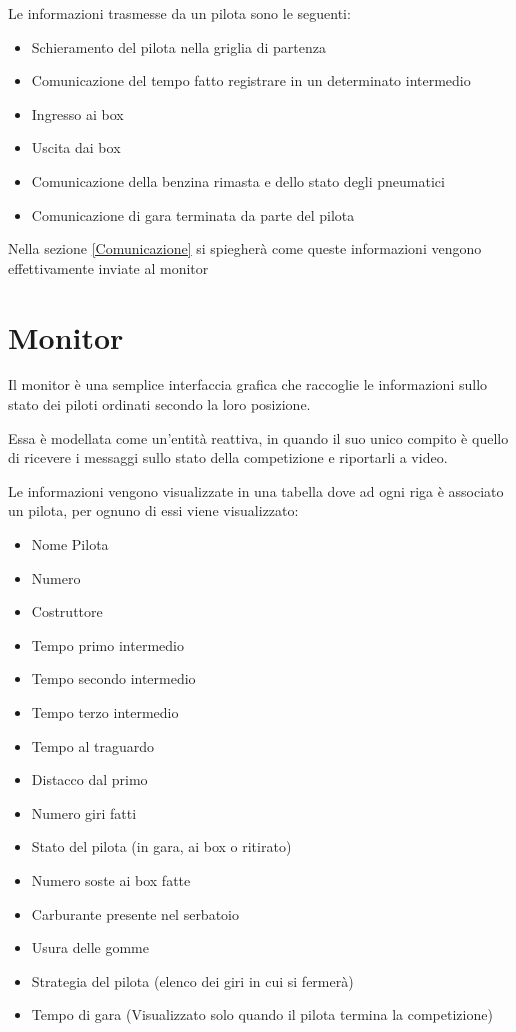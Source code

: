 \documentclass[a4paper,11pt, twoside]{book}
\begin{document}
	Le informazioni trasmesse da un pilota sono le seguenti:
	
	\begin{itemize}
	  \item Schieramento del pilota nella griglia di partenza
	  \item Comunicazione del tempo fatto registrare in un determinato intermedio
	  \item Ingresso ai box
	  \item Uscita dai box
	  \item Comunicazione della benzina rimasta e dello stato degli pneumatici
	  \item Comunicazione di gara terminata da parte del pilota
	\end{itemize}
	
	Nella sezione \ref{Comunicazione} si spiegherà come queste informazioni vengono effettivamente inviate al monitor
	
    \section{Monitor}
      Il monitor è una semplice interfaccia grafica che raccoglie le informazioni sullo stato dei piloti ordinati secondo
      la loro posizione.
      
      Essa è modellata come un'entità reattiva, in quando il suo unico compito è quello di ricevere i messaggi
      sullo stato della competizione e riportarli a video.
      
      Le informazioni vengono visualizzate in una tabella dove ad ogni riga è associato un pilota, per ognuno di essi
      viene visualizzato:
      \begin{itemize}
	\item Nome Pilota
	\item Numero
	\item Costruttore
	\item Tempo primo intermedio
	\item Tempo secondo intermedio
	\item Tempo terzo intermedio
	\item Tempo al traguardo
	\item Distacco dal primo
	\item Numero giri fatti
	\item Stato del pilota (in gara, ai box o ritirato)
	\item Numero soste ai box fatte
	\item Carburante presente nel serbatoio
	\item Usura delle gomme
	\item Strategia del pilota (elenco dei giri in cui si fermerà)
	\item Tempo di gara (Visualizzato solo quando il pilota termina la competizione)
      \end{itemize}
      
\end{document}
